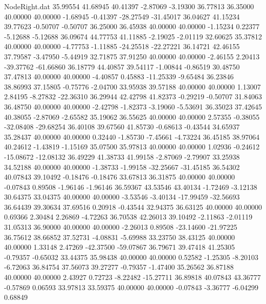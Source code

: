 \begin{filecontents}{NodeRight.dat}
  35.99554   41.68945   40.41397    -2.87069   -3.19300   36.77813   36.35000   40.00000   40.00000   -1.68945   -0.41397  -28.27549  -31.45017
  36.04627   41.15234   39.77623    -0.50707   -0.50707   36.25000   36.45938   40.00000   40.00000   -1.15234    0.22377   -5.12688   -5.12688
  36.09674   44.77753   41.11885    -2.19025   -2.01119   32.60625   35.37812   40.00000   40.00000   -4.77753   -1.11885  -24.25518  -22.27221
  36.14721   42.46155   37.79587    -3.47950   -5.44919   32.71875   37.91250   40.00000   40.00000   -2.46155    2.20413  -39.37762  -61.66860
  36.18779   44.40857   39.54117    -1.00844   -0.86519   30.48750   37.47813   40.00000   40.00000   -4.40857    0.45883  -11.25339   -9.65484
  36.23846   38.86993   37.15805    -0.75776   -2.04700   33.95938   39.57188   40.00000   40.00000    1.13007    2.84195   -8.27832  -22.36310
  36.29944   42.42798   41.82373    -0.29219   -0.50707   31.84063   36.48750   40.00000   40.00000   -2.42798   -1.82373   -3.19060   -5.53691
  36.35023   37.42645   40.38055    -2.87069   -2.65582   35.19062   36.55625   40.00000   40.00000    2.57355   -0.38055  -32.08408  -29.68254
  36.40108   39.67560   41.85730    -0.68613   -0.43544   34.65937   35.28437   40.00000   40.00000    0.32440   -1.85730   -7.45661   -4.73224
  36.45185   38.97064   40.24612    -1.43819   -1.15169   35.07500   35.97813   40.00000   40.00000    1.02936   -0.24612  -15.08672  -12.08132
  36.49229   41.38733   41.99158    -2.87069   -2.79907   33.25938   34.52188   40.00000   40.00000   -1.38733   -1.99158  -32.25667  -31.45185
  36.54302   40.07843   39.10492    -0.18476   -0.18476   33.67813   36.31875   40.00000   40.00000   -0.07843    0.89508   -1.96146   -1.96146
  36.59367   43.53546   43.40134    -1.72469   -3.12138   30.64375   33.04375   40.00000   40.00000   -3.53546   -3.40134  -17.99459  -32.56693
  36.64439   39.30634   37.69516     0.20918   -0.43544   32.94375   36.63125   40.00000   40.00000    0.69366    2.30484    2.26869   -4.72263
  36.70538   42.26013   39.10492    -2.11863   -2.01119   31.05313   36.90000   40.00000   40.00000   -2.26013    0.89508  -23.14600  -21.97225
  36.75612   38.66852   37.52731    -4.08831   -5.69988   33.23750   38.43125   40.00000   40.00000    1.33148    2.47269  -42.37500  -59.07867
  36.79671   39.47418   41.25305    -0.79357   -0.65032   33.44375   35.98438   40.00000   40.00000    0.52582   -1.25305   -8.20103   -6.72063
  36.84754   37.56073   39.27277    -0.79357   -1.47400   35.26562   36.87188   40.00000   40.00000    2.43927    0.72723   -8.22482  -15.27711
  36.89818   40.07843   43.36777    -0.57869    0.06593   33.97813   33.59375   40.00000   40.00000   -0.07843   -3.36777   -6.04299    0.68849

\end{filecontents}

